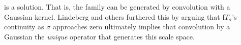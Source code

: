     is a solution.  That is, the family can be generated by convolution with a Gaussian kernel. Lindeberg and others furthered this by arguing that f$T_\sigma$'s continuity as $\sigma$ approaches zero ultimately implies that convolution by a Gaussian the \textit{unique} operator that generates this scale space. 
%    
%    
%    
%    
%    
%
